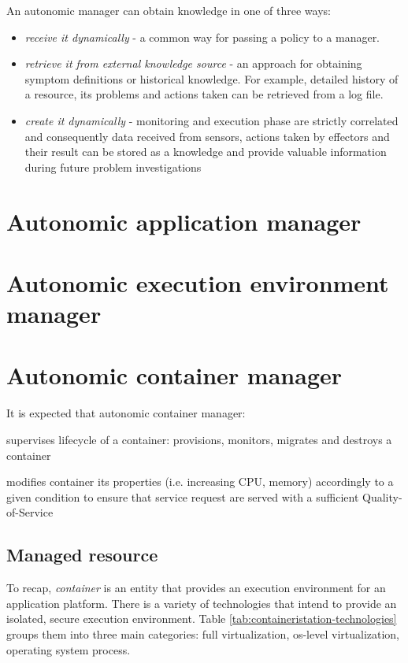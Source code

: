 An autonomic manager can obtain knowledge in one of three ways:
\begin{itemize}
 \item \emph{receive it dynamically} - a common way for passing a policy to a manager. 
 \item \emph{retrieve it from external knowledge source} - an approach for obtaining symptom definitions or historical knowledge. For example, detailed history of a resource, its problems and actions taken can be retrieved from a log file.
 \item \emph{create it dynamically} - monitoring and execution phase are strictly correlated and consequently data received from sensors, actions taken by effectors and their result can be stored as a knowledge and provide valuable information during future problem investigations
\end{itemize}


\section{Autonomic application manager}

\section{Autonomic execution environment manager}

\section{Autonomic container manager}
It is expected that autonomic container manager:
\begin{inparaenum}[1)]
 \item supervises lifecycle of a container: provisions, monitors, migrates and destroys a container
 \item modifies container its properties (i.e. increasing CPU, memory) accordingly to a given condition to ensure that service request are served with a sufficient Quality-of-Service
\end{inparaenum}

\subsection{Managed resource}
To recap, \emph{container} is an entity that provides an execution environment for an application platform. There is a variety of technologies that intend to provide an isolated, secure execution environment. Table \ref{tab:containeristation-technologies} groups them into three main categories: full virtualization, os-level virtualization, operating system process.

